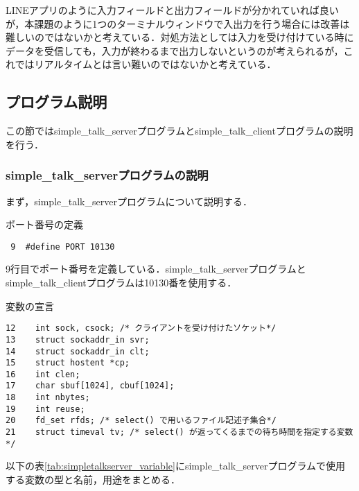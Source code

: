 \documentclass[a4j]{jarticle}
\newenvironment{bit}{\begin{breakitembox}}{\end{breakitembox}} %
\newcommand{\sts}{simple\_talk\_serverプログラム}
\newcommand{\stc}{simple\_talk\_clientプログラム}
\begin{document}
LINEアプリのように入力フィールドと出力フィールドが分かれていれば良いが，本課題のように1つのターミナルウィンドウで入出力を行う場合には改善は難しいのではないかと考えている．対処方法としては入力を受け付けている時にデータを受信しても，入力が終わるまで出力しないというのが考えられるが，これではリアルタイムとは言い難いのではないかと考えている．

\subsection{プログラム説明}

この節では\sts と\stc の説明を行う．

\subsubsection{\sts の説明}

まず，\sts について説明する．

\begin{bit}[l]{ポート番号の定義}
\begin{verbatim}
 9	#define PORT 10130
\end{verbatim}
\end{bit}

9行目でポート番号を定義している．\sts と\stc は10130番を使用する．

\begin{bit}[l]{変数の宣言}
\begin{verbatim}
12	  int sock, csock; /* クライアントを受け付けたソケット*/
13	  struct sockaddr_in svr;
14	  struct sockaddr_in clt;
15	  struct hostent *cp;
16	  int clen;
17	  char sbuf[1024], cbuf[1024];
18	  int nbytes;
19	  int reuse;
20	  fd_set rfds; /* select() で用いるファイル記述子集合*/
21	  struct timeval tv; /* select() が返ってくるまでの待ち時間を指定する変数*/
\end{verbatim}
\end{bit}

以下の表\ref{tab:simpletalkserver_variable}に\sts で使用する変数の型と名前，用途をまとめる．
\end{document}
